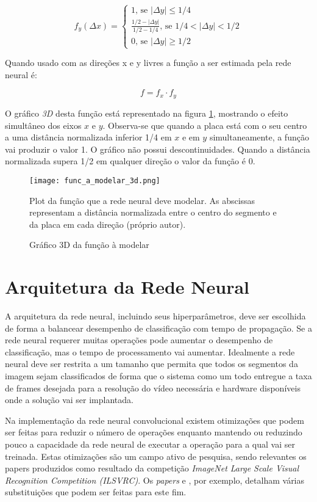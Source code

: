 \begin{equation}
	f_y(\Delta x) = \begin{cases}
		1 \text{, se } |\Delta y| \leq 1/4
		\\
		\frac{1/2-|\Delta y|}{1/2-1/4} \text{, se } 1/4<|\Delta y|<1/2
		\\
		0 \text{, se } |\Delta y| \geq 1/2
	\end{cases}
\end{equation}

Quando usado com as direções x e y livres a função a ser estimada pela rede
neural é:

\begin{equation} \label{eq:funcao_a_modelar}
	f=f_x \cdot f_y
\end{equation}

O gráfico \emph{3D} desta função está representado na figura
\ref{fig:func_a_modelar_3d}, mostrando o
efeito simultâneo dos eixos $x$ e $y$.  Observa-se que quando a placa
está com o seu centro a uma distância normalizada inferior 1/4 em $x$ e em $y$
simultaneamente, a função vai produzir o valor 1. O gráfico não possui
descontinuidades. Quando a distância normalizada supera 1/2 em qualquer
direção o valor da função é 0.

\begin{figure}[!htb]
	\centering
	\texttt{[image: func\_a\_modelar\_3d.png]}
	\caption{Gráfico 3D da função à modelar}
	\label{fig:func_a_modelar_3d}
	Plot da função que a rede neural deve modelar. As abscissas representam a
	distância normalizada entre o centro do segmento e da placa em cada direção
	(próprio autor).
\end{figure}


\section{Arquitetura da Rede Neural}

A arquitetura da rede neural, incluindo seus hiperparâmetros, deve ser
escolhida de forma a balancear desempenho de classificação com tempo de
propagação. Se a rede neural requerer muitas operações pode aumentar o
desempenho de classificação, mas o tempo de processamento vai aumentar.
Idealmente a rede neural deve ser restrita a um tamanho que permita que todos
os segmentos da imagem sejam classificados de forma que o sistema como um todo
entregue a taxa de frames desejada para a resolução do vídeo necessária e
hardware disponíveis onde a solução vai ser implantada.

Na implementação da rede neural convolucional existem otimizações que podem ser
feitas para reduzir o número de operações enquanto mantendo ou reduzindo pouco
a capacidade da rede neural de executar a operação para a qual vai ser
treinada. Estas otimizações são um campo ativo de pesquisa, sendo relevantes os
papers produzidos como resultado da competição \emph{ImageNet Large Scale
Visual Recognition Competition (ILSVRC)}. Os \emph{papers}
\cite{szegedy2015going} e \cite{szegedy2015rethinking},
por exemplo, detalham várias substituições que podem ser feitas para este fim.


